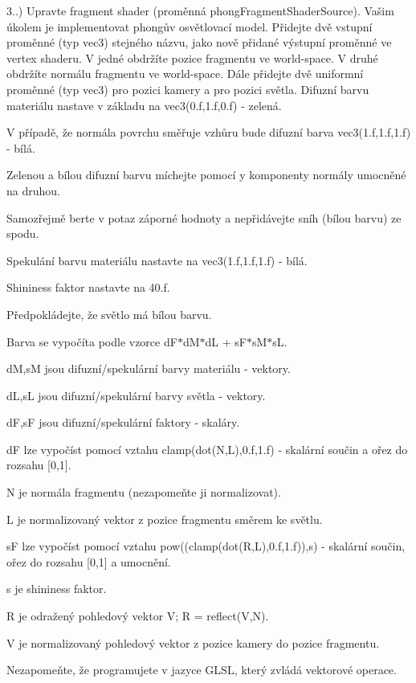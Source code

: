 \begin{DoxyRefList}
3..) Upravte fragment shader (proměnná phong\-Fragment\-Shader\-Source). Vašim úkolem je implementovat phongův osvětlovací model. Přidejte dvě vstupní proměnné (typ vec3) stejného názvu, jako nově přidané výstupní proměnné ve vertex shaderu. V jedné obdržíte pozice fragmentu ve world-\/space. V druhé obdržíte normálu fragmentu ve world-\/space. Dále přidejte dvě uniformní proměnné (typ vec3) pro pozici kamery a pro pozici světla. Difuzní barvu materiálu nastave v základu na vec3(0.\-f,1.\-f,0.\-f) -\/ zelená.\par
 V případě, že normála povrchu směřuje vzhůru bude difuzní barva vec3(1.\-f,1.\-f,1.\-f) -\/ bílá.\par
 Zelenou a bílou difuzní barvu míchejte pomocí y komponenty normály umocněné na druhou.\par
 Samozřejmě berte v potaz záporné hodnoty a nepřidávejte sníh (bílou barvu) ze spodu.\par
 Spekulání barvu materiálu nastavte na vec3(1.\-f,1.\-f,1.\-f) -\/ bílá.\par
 Shininess faktor nastavte na 40.\-f.\par
 Předpokládejte, že světlo má bílou barvu.\par
 Barva se vypočíta podle vzorce d\-F$\ast$d\-M$\ast$d\-L + s\-F$\ast$s\-M$\ast$s\-L.\par
 d\-M,s\-M jsou difuzní/spekulární barvy materiálu -\/ vektory.\par
 d\-L,s\-L jsou difuzní/spekulární barvy světla -\/ vektory.\par
 d\-F,s\-F jsou difuzní/spekulární faktory -\/ skaláry.\par
 d\-F lze vypočíst pomocí vztahu clamp(dot(\-N,\-L),0.\-f,1.\-f) -\/ skalární součin a ořez do rozsahu \mbox{[}0,1\mbox{]}.\par
 N je normála fragmentu (nezapomeňte ji normalizovat).\par
 L je normalizovaný vektor z pozice fragmentu směrem ke světlu.\par
 s\-F lze vypočíst pomocí vztahu pow((clamp(dot(\-R,\-L),0.\-f,1.\-f)),s) -\/ skalární součin, ořez do rozsahu \mbox{[}0,1\mbox{]} a umocnění.\par
 s je shininess faktor.\par
 R je odražený pohledový vektor V; R = reflect(\-V,\-N).\par
 V je normalizovaný pohledový vektor z pozice kamery do pozice fragmentu.\par
 \par
 Nezapomeňte, že programujete v jazyce G\-L\-S\-L, který zvládá vektorové operace.\par

\end{DoxyRefList}
